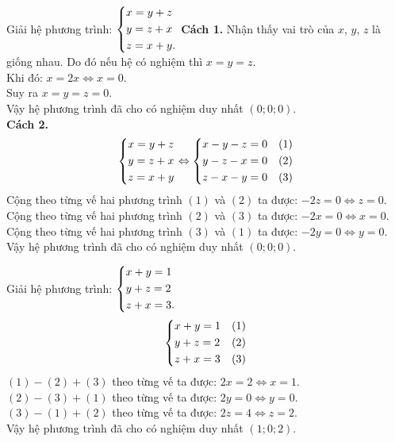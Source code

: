 \begin{ex}%
 Giải hệ phương trình: $\left\{\begin{aligned}& x=y+z \\& y=z+x \\& z=x+y.\end{aligned}\right.$
 \loigiai
  {
  \textbf{Cách 1.} Nhận thấy vai trò của $x$, $y$, $z$ là giống nhau. Do đó nếu hệ có nghiệm thì $x = y = z$.\\
  Khi đó: $x = 2x \Leftrightarrow x = 0$.\\
  Suy ra $x = y = z = 0$.\\
  Vậy hệ phương trình đã cho có nghiệm duy nhất $(0;0;0)$.\\
  \textbf{Cách 2.}\\
  $$\left\{\begin{aligned}& x=y+z \\& y=z+x \\& z=x+y\end{aligned}\right. \Leftrightarrow \left\{\begin{aligned}& x-y-z=0 & (1) \\& y-z-x=0 & (2) \\& z-x-y=0 & (3)\end{aligned}\right.$$
  Cộng theo từng vế hai phương trình $(1)$ và $(2)$ ta được: $-2z = 0 \Leftrightarrow z = 0$.\\
  Cộng theo từng vế hai phương trình $(2)$ và $(3)$ ta được: $-2x = 0 \Leftrightarrow x = 0$.\\
  Cộng theo từng vế hai phương trình $(3)$ và $(1)$ ta được: $-2y = 0 \Leftrightarrow y = 0$.\\
  Vậy hệ phương trình đã cho có nghiệm duy nhất $(0;0;0)$.
  }
\end{ex}


\begin{ex}%
 Giải hệ phương trình: $\left\{\begin{aligned}& x+y=1 \\& y+z=2 \\& z+x=3.\end{aligned}\right.$
 \loigiai
  {
  $$\left\{\begin{aligned}& x+y=1 & (1) \\& y+z=2 & (2) \\& z+x=3 & (3)\end{aligned}\right.$$
  $(1) - (2) + (3)$ theo từng vế ta được: $2x = 2 \Leftrightarrow x = 1$.\\
  $(2) - (3) + (1)$ theo từng vế ta được: $2y = 0 \Leftrightarrow y = 0$.\\
  $(3) - (1) + (2)$ theo từng vế ta được: $2z = 4 \Leftrightarrow z = 2$.\\
  Vậy hệ phương trình đã cho có nghiệm duy nhất $(1;0;2)$.
  }
\end{ex}


